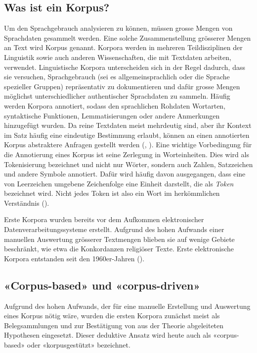 \subsection{Was ist ein Korpus?}
Um den Sprachgebrauch analysieren zu können, müssen grosse Mengen von Sprachdaten gesammelt werden. Eine solche Zusammenstellung grösserer Mengen an Text wird Korpus genannt. Korpora werden in mehreren Teildisziplinen der Linguistik sowie auch anderen Wissenschaften, die mit Textdaten arbeiten, verwendet. Linguistische Korpora unterscheiden sich in der Regel dadurch, dass sie versuchen, Sprachgebrauch (sei es allgemeinsprachlich oder die Sprache spezieller Gruppen) repräsentativ zu dokumentieren und dafür grosse Mengen möglichst unterschiedlicher authentischer Sprachdaten zu sammeln. Häufig werden Korpora annotiert, sodass den sprachlichen Rohdaten Wortarten, syntaktische Funktionen, Lemmatisierungen oder andere Anmerkungen hinzugefügt wurden. Da reine Textdaten meist mehrdeutig sind, aber ihr Kontext im Satz häufig eine eindeutige Bestimmung erlaubt, können an einen annotierten Korpus abstraktere Anfragen gestellt werden (\cite[22-23, 56]{stefanowitsch_anatol_corpus_2020}, 
\cite[58-59]{lemnitzer_korpuslinguistik_2015}). Eine wichtige Vorbedingung für die Annotierung eines Korpus ist seine Zerlegung in Worteinheiten. Dies wird als Tokenisierung bezeichnet und nicht nur Wörter, sondern auch Zahlen, Satzzeichen und andere Symbole annotiert. Dafür wird häufig davon ausgegangen, dass eine von Leerzeichen umgebene Zeichenfolge eine Einheit darstellt, die als \textit{Token} bezeichnet wird. Nicht jedes Token ist also ein Wort im herkömmlichen Verständnis (\cite[61-62]{lemnitzer_korpuslinguistik_2015}).

Erste Korpora wurden bereits vor dem Aufkommen elektronischer Datenverarbeitungssysteme erstellt. Aufgrund des hohen Aufwands einer manuellen Auswertung grösserer Textmengen blieben sie auf wenige Gebiete beschränkt, wie etwa die Konkordanzen religiöser Texte. Erste elektronische Korpora entstanden seit den 1960er-Jahren (\cite[52]{tognini-bonelli_corpus_2001}).

\subsection{«Corpus-based» und «corpus-driven»}
Aufgrund des hohen Aufwands, der für eine manuelle Erstellung und Auswertung eines Korpus nötig wäre, wurden die ersten Korpora zunächst meist als Belegsammlungen und zur Bestätigung von aus der Theorie abgeleiteten Hypothesen eingesetzt. Dieser deduktive Ansatz wird heute auch als «corpus-based» oder «korpusgestützt» bezeichnet. 

